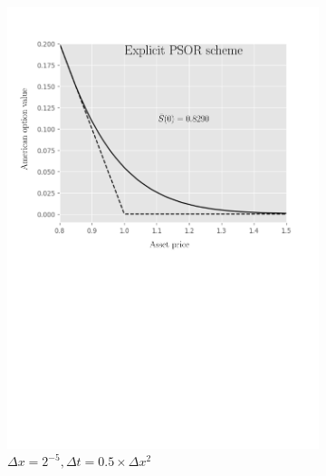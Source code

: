 \begin{figure}[H]
\begin{subfigure}{0.4\textwidth}
    \includegraphics[width=\textwidth]{chapters/chapter5/TestCase4ExplicitLCP.pdf}
    \caption{$\Delta{x}=2^{-5}, \Delta{t}=0.5\times\Delta{x}^2$}
    \label{fig:lcp:numericaresults:test_case_4_explicit}
  \end{subfigure}
  \begin{subfigure}{0.4\textwidth}
    \centering

\end{subfigure}
\end{figure}
